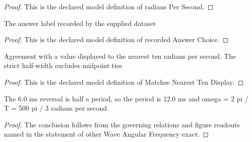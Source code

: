 \begin{proof}
  This is the declared model definition of radians Per Second.
\end{proof}
\begin{definition}
  \label{def:physics:phyx-mini-0297:phyxminiproblems-problemphyxmini0297-recordedanswerchoice}
  The answer label recorded by the supplied dataset
\end{definition}
\begin{proof}
  This is the declared model definition of recorded Answer Choice.
\end{proof}
\begin{definition}
  \label{def:physics:phyx-mini-0297:phyxminiproblems-problemphyxmini0297-matchesnearesttendisplay}
  Agreement with a value displayed to the nearest ten radians per second. The strict half-width excludes midpoint ties
\end{definition}
\begin{proof}
  This is the declared model definition of Matches Nearest Ten Display.
\end{proof}
\begin{lemma}
  \label{lem:physics:phyx-mini-0297:phyxminiproblems-problemphyxmini0297-otherwaveangularfrequency-exact}
  The 6.0 ms reversal is half a period, so the period is 12.0 ms and omega = 2 pi / T = 500 pi / 3 radians per second
\end{lemma}
\begin{proof}
  The conclusion follows from the governing relations and figure readouts named in the statement of other Wave Angular Frequency exact.
\end{proof}
